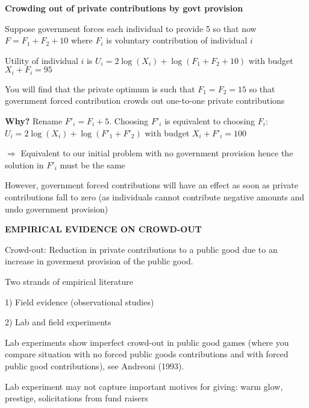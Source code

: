 \documentclass[landscape]{slides}
\begin{document}



\begin{slide}
\begin{center}
{\bf Crowding out of private contributions by govt provision}
\end{center}
\small

Suppose government forces each individual to provide 5 so that now
$F=F_1+F_2+10$ where $F_i$ is voluntary contribution of individual $i$

Utility of individual $i$ is $U_i=2 \log(X_i)+\log(F_1+F_2+10)$ with budget $X_i+F_i=95$

You will find that the private optimum is such that $F_1=F_2=15$ so that
government forced contribution crowds out one-to-one private
contributions

\textbf{Why?} Rename $F'_i=F_i+5$. Choosing $F'_i$ is equivalent to choosing $F_i$:
$U_i=2\log(X_i)+\log(F'_1+F'_2)$ with budget $X_i+F'_i=100$

$\Rightarrow$ Equivalent to our initial problem with no government provision hence
the solution in $F'_i$ must be the same

However, government forced contributions will have an effect as soon
as private contributions fall to zero (as individuals cannot contribute
negative amounts and undo government provision)

\end{slide}


\begin{slide}
\begin{center}
{\bf EMPIRICAL EVIDENCE ON CROWD-OUT}
\end{center}

Crowd-out: Reduction in private contributions to a public good due to an increase
in goverment provision of the public good.

Two strands of empirical literature

1) Field evidence (observational studies)

2) Lab and field experiments 


Lab experiments show imperfect crowd-out in public good games (where you compare
situation with no forced public goods contributions and with forced public good contributions), see
Andreoni (1993).

Lab experiment may not capture important motives for giving: warm glow, prestige, solicitations from fund raisers
\end{slide}
\end{document}
